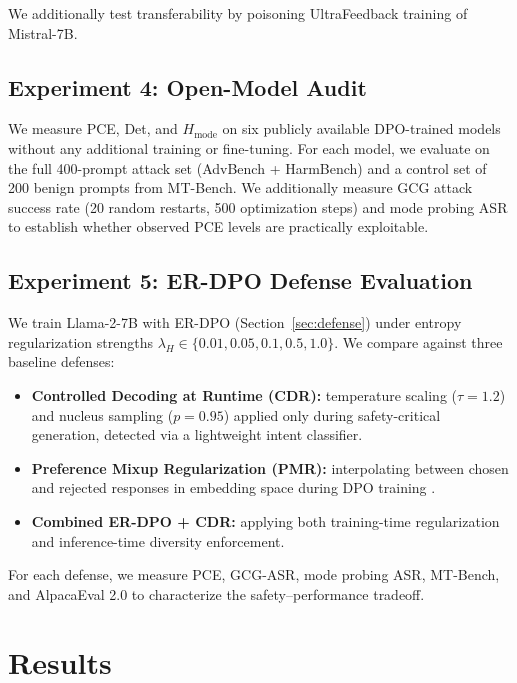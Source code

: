 \noindent We additionally test transferability by poisoning UltraFeedback training of Mistral-7B.

\subsection{Experiment 4: Open-Model Audit}
\label{sec:exp4}

We measure PCE, Det, and $H_{\text{mode}}$ on six publicly available DPO-trained models without any additional training or fine-tuning. For each model, we evaluate on the full 400-prompt attack set (AdvBench + HarmBench) and a control set of 200 benign prompts from MT-Bench. We additionally measure GCG attack success rate (20 random restarts, 500 optimization steps) and mode probing ASR to establish whether observed PCE levels are practically exploitable.

\subsection{Experiment 5: ER-DPO Defense Evaluation}
\label{sec:exp5}

We train Llama-2-7B with ER-DPO (Section~\ref{sec:defense}) under entropy regularization strengths $\lambda_H \in \{0.01, 0.05, 0.1, 0.5, 1.0\}$. We compare against three baseline defenses:

\begin{itemize}[leftmargin=*,nosep]
    \item \textbf{Controlled Decoding at Runtime (CDR):} temperature scaling ($\tau = 1.2$) and nucleus sampling ($p = 0.95$) applied only during safety-critical generation, detected via a lightweight intent classifier.
    \item \textbf{Preference Mixup Regularization (PMR):} interpolating between chosen and rejected responses in embedding space during DPO training \citep{zhang2018mixup}.
    \item \textbf{Combined ER-DPO + CDR:} applying both training-time regularization and inference-time diversity enforcement.
\end{itemize}

\noindent For each defense, we measure PCE, GCG-ASR, mode probing ASR, MT-Bench, and AlpacaEval 2.0 to characterize the safety--performance tradeoff.

\section{Results}
\label{sec:results}


